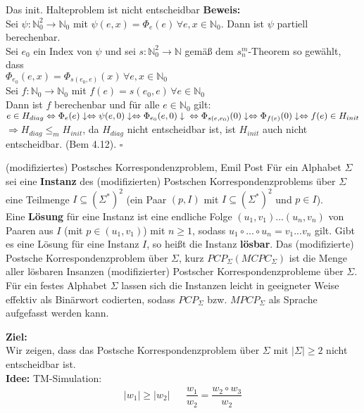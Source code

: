 \begin{satz}{Das init. Halteproblem ist nicht entscheidbar}
    \textbf{Beweis:}\\
    Sei $\psi : \mathbb{N}_0^2 \rightarrow \mathbb{N}_0$ mit $\psi(e,x) = \Phi_e(e) \, \forall e,x \in \mathbb{N}_0$. Dann ist $\psi$ partiell berechenbar. \\
    Sei $e_0$ ein Index von $\psi$ und sei $s:\mathbb{N}_0^2 \rightarrow \mathbb{N}$ gemäß dem $s^m_n$-Theorem so gewählt, 
    dass \\ $\Phi_{e_0}(e,x) = \Phi_{s(e_0,e)}(x) \, \forall e,x \in \mathbb{N}_0$ \\
    Sei $f: \mathbb{N}_0 \rightarrow \mathbb{N}_0$ mit $f(e) = s(e_0,e) \, \forall e\in \mathbb{N}_0$ \\

    Dann ist $f$ berechenbar und für alle $e \in \mathbb{N}_0$ gilt:\\
    $e \in H_{diag} \Leftrightarrow \Phi_e(e)\downarrow \Leftrightarrow \psi(e,0)\downarrow \Leftrightarrow \Phi_{e_0}(e,0)\downarrow \\
    \Leftrightarrow \Phi_{s(e,e_0)}(0)\downarrow \Leftrightarrow \Phi_{f(e)}(0)\downarrow \Leftrightarrow f(e) \in H_{init}$ \\

    $\Rightarrow H_{diag} \leq_m H_{init}$, da $H_{diag}$ nicht entscheidbar ist, ist $H_{init}$ auch nicht entscheidbar. (Bem 4.12). $\square$
\end{satz}

\begin{defn}{(modifiziertes) Postsches Korrespondenzproblem, Emil Post}
    Für ein Alphabet $\Sigma$ sei eine \textbf{Instanz} des (modifizierten) Postschen Korrespondenzproblems über $\Sigma$ eine Teilmenge $I \subseteq (\Sigma^*)^2$ 
    (ein Paar $(p, I)$ mit $I \subseteq (\Sigma^*)^2$ und $p \in I$). \\

    Eine \textbf{Lösung} für eine Instanz ist eine endliche Folge $(u_1,v_1)...(u_n,v_n)$ von Paaren aus $I$ (mit $p \in (u_1,v_1)$) mit $n \geq 1$, sodass
    $u_1 \circ ... \circ u_n = v_1...v_n$ gilt. Gibt es eine Lösung für eine Instanz $I$, so heißt die Instanz \textbf{lösbar}. Das (modifizierte) Postsche 
    Korrespondenzproblem über $\Sigma$, kurz $PCP_\Sigma (MCPC_\Sigma)$ ist die Menge aller lösbaren Insanzen (modifizierter) Postscher Korrespondenzprobleme 
    über $\Sigma$. \\

    Für ein festes Alphabet $\Sigma$ lassen sich die Instanzen leicht in geeigneter Weise effektiv als Binärwort codierten, sodass $PCP_\Sigma$ bzw. $MPCP_\Sigma$ 
    als Sprache aufgefasst werden kann.
\end{defn}

\textbf{Ziel:} \\
Wir zeigen, dass das Postsche Korrespondenzproblem über $\Sigma$ mit $|\Sigma| \geq 2$ nicht entscheidbar ist. \\

\textbf{Idee:} TM-Simulation: \\
\begin{align*}
    |w_1| \geq |w_2| && \dfrac{w_1}{w_2} = \dfrac{w_2 \circ w_3}{w_2} \\
\end{align*}
